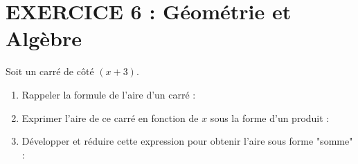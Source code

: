 \documentclass[11pt,a4paper]{article}
\begin{document}
    \section*{EXERCICE 6 : Géométrie et Algèbre}
    
    
    Soit un carré de côté $(x + 3)$.
    \begin{enumerate}
        \item Rappeler la formule de l'aire d'un carré : \dotfill
        \item Exprimer l'aire de ce carré en fonction de $x$ sous la forme d'un produit : \dotfill
        \item Développer et réduire cette expression pour obtenir l'aire sous forme "somme" : \\
        \dotfill
    \end{enumerate}
    
\end{document}
